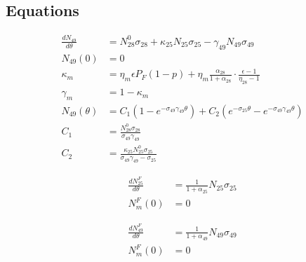 \documentclass[11pt,a4paper]{article}
\begin{document}
\newpage




\begin{appendices}


    \renewcommand{\thesection}{\Roman{section}}


    \section{Equations} \label{app-equations}
    \begin{equation}
        \begin{aligned}
            \frac{dN_{49}}{d\theta} & = N_{28}^{0} \sigma_{28}  +  \kappa_{25} N_{25} \sigma_{25} - \gamma_{49} N_{49} \sigma_{49}
            \\
            N_{49}(0) &= 0
            \\
            \kappa_m &= \eta_m \epsilon P_F (1-p) + \eta_m \frac{\alpha_{28}}{1 +  \alpha_{28}}\cdot\frac{\epsilon-1}{\eta_{28}-1}
            \\
            \gamma_m &= 1-\kappa_m
            \\
            N_{49}(\theta) &= C_1(1-e^{-\sigma_{49}\gamma_{49}\theta}) + C_2(e^{- \sigma_{25}\theta}-e^{-\sigma_{49}\gamma_{49}\theta})
            \\
            C_1 &= \frac{N_{28}^0\sigma_{28}}{\sigma_{49}\gamma_{49}}
            \\
            C_2 &= \frac{\kappa_{25} N_{25}^0 \sigma_{25}}{\sigma_{49}\gamma_{49}- \sigma_{25}}
        \end{aligned}
    \end{equation}

    \begin{equation}
        \begin{aligned}
            \frac{dN_{25}^F}{d\theta} &= \frac{1}{1 + \alpha_{25}}N_{25}\sigma_{25}
            \\
            N^F_m(0) &= 0
        \end{aligned}
    \end{equation}

    \begin{equation}
        \begin{aligned}
            \frac{dN_{49}^F}{d\theta} & = \frac{1}{1 + \alpha_{49}}N_{49}\sigma_{49}
            \\
            N^F_m(0) &= 0
        \end{aligned}
    \end{equation}


\end{appendices}
\end{document}
